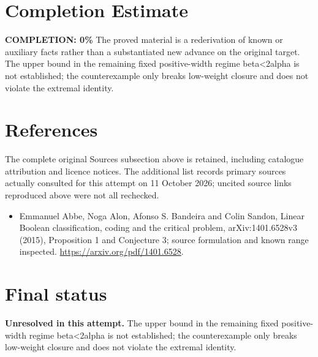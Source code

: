 \documentclass[11pt]{article}
\begin{document}
\section{Completion Estimate}
\noindent\textbf{COMPLETION: 0\%}
The proved material is a rederivation of known or auxiliary facts rather than a substantiated new advance on the original target. The upper bound in the remaining fixed positive-width regime beta<2alpha is not established; the counterexample only breaks low-weight closure and does not violate the extremal identity.
\section{References}
The complete original Sources subsection above is retained, including catalogue attribution and licence notices. The additional list records primary sources actually consulted for this attempt on 11 October 2026; uncited source links reproduced above were not all rechecked.
\begin{itemize}
\item Emmanuel Abbe, Noga Alon, Afonso S. Bandeira and Colin Sandon, Linear Boolean classification, coding and the critical problem, arXiv:1401.6528v3 (2015), Proposition 1 and Conjecture 3; source formulation and known range inspected. \url{https://arxiv.org/pdf/1401.6528}.
\end{itemize}
\section{Final status}
\textbf{Unresolved in this attempt.} The upper bound in the remaining fixed positive-width regime beta<2alpha is not established; the counterexample only breaks low-weight closure and does not violate the extremal identity.
\end{document}
